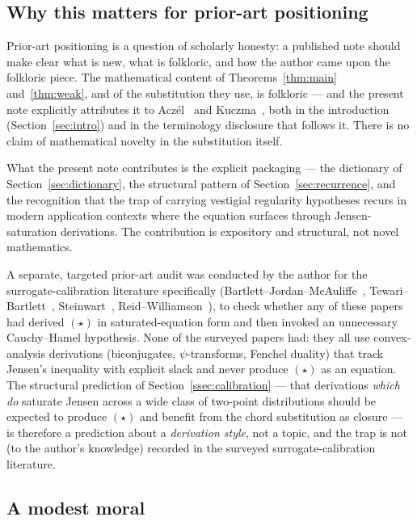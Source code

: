 \documentclass[review,12pt,a4paper]{elsarticle}
\theoremstyle{remark}
\begin{document}
\subsection{Why this matters for prior-art positioning}

Prior-art positioning is a question of scholarly honesty: a published
note should make clear what is new, what is folkloric, and how the
author came upon the folkloric piece. The mathematical content of
Theorems~\ref{thm:main} and~\ref{thm:weak}, and of the substitution
they use, is folkloric --- and the present note explicitly attributes it
to Acz\'el~\cite[\S2.1]{Aczel1966} and
Kuczma~\cite[Ch.~13]{Kuczma2009}, both in the introduction
(Section~\ref{sec:intro}) and in the terminology disclosure that
follows it. There is no claim of mathematical novelty in the substitution
itself.

What the present note contributes is the explicit packaging --- the
dictionary of Section~\ref{sec:dictionary}, the structural pattern of
Section~\ref{sec:recurrence}, and the recognition that the trap of
carrying vestigial regularity hypotheses recurs in modern application
contexts where the equation surfaces through Jensen-saturation
derivations. The contribution is expository and structural, not novel
mathematics.

A separate, targeted prior-art audit was conducted by the author for the
surrogate-calibration literature specifically (Bartlett--Jordan--McAuliffe~\cite{BJM2006},
Tewari--Bartlett~\cite{TewariBartlett2007}, Steinwart~\cite{Steinwart2007},
Reid--Williamson~\cite{ReidWilliamson2010,ReidWilliamson2011}), to check
whether any of these papers had derived $(\star)$ in saturated-equation
form and then invoked an unnecessary Cauchy--Hamel hypothesis. None of
the surveyed papers had: they all use convex-analysis derivations
(biconjugates, $\psi$-transforms, Fenchel duality) that track Jensen's
inequality with explicit slack and never produce $(\star)$ as an
equation. The structural prediction of Section~\ref{ssec:calibration}
--- that derivations \emph{which do} saturate Jensen across a wide class
of two-point distributions should be expected to produce $(\star)$ and
benefit from the chord substitution as closure --- is therefore a
prediction about a \emph{derivation style}, not a topic, and the trap is
not (to the author's knowledge) recorded in the surveyed
surrogate-calibration literature.

\subsection{A modest moral}
\end{document}

